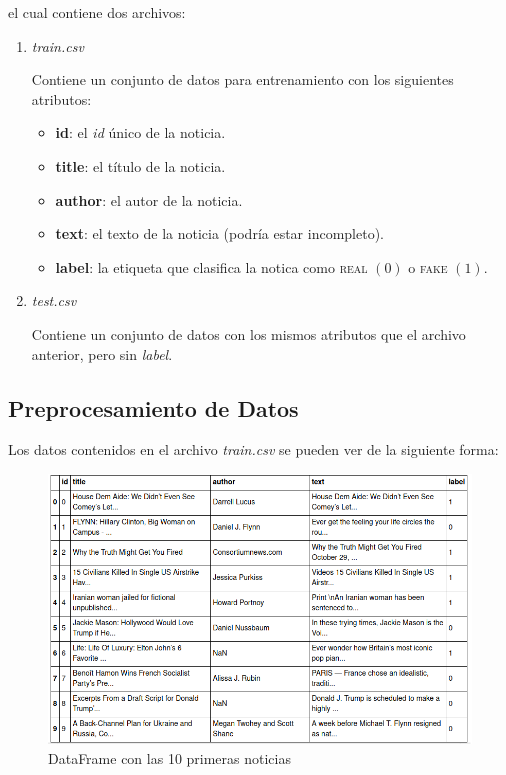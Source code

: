 \documentclass[letterpaper,11pt]{article}
\begin{document}
el cual contiene dos archivos:
\begin{enumerate}
    \item \textit{train.csv}

    Contiene un conjunto de datos para entrenamiento con los siguientes 
    atributos:
    \begin{itemize}
        \item \textbf{id}: el \textit{id} único de la noticia.
        \item \textbf{title}: el título de la noticia.
        \item \textbf{author}: el autor de la noticia.
        \item \textbf{text}: el texto de la noticia (podría estar incompleto).
        \item \textbf{label}: la etiqueta que clasifica la notica como 
        \textsc{real} $(0)$ o \textsc{fake} $(1)$.  
    \end{itemize}

    \item \textit{test.csv}

    Contiene un conjunto de datos con los mismos atributos que el archivo 
    anterior, pero sin \textit{label}. 
\end{enumerate} 

\newpage
\subsection{Preprocesamiento de Datos}

Los datos contenidos en el archivo \textit{train.csv} se pueden ver de la 
siguiente forma:
\begin{figure}[h!]
    \centering
    \includegraphics[width=1\textwidth]{imagenes/dataframe.png}
    \caption{DataFrame con las 10 primeras noticias}
    \label{fig: dataframe1}
\end{figure}
\end{document}

